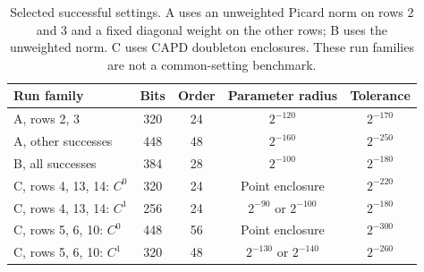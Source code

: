 \begin{table}[htbp]
\centering\small
\begin{tabular}{@{}lcccc@{}}
\toprule
Run family & Bits & Order & Parameter radius & Tolerance\\
\midrule
A, rows 2, 3 & 320 & 24 & $2^{-120}$ & $2^{-170}$\\
A, other successes & 448 & 48 & $2^{-160}$ & $2^{-250}$\\
B, all successes & 384 & 28 & $2^{-100}$ & $2^{-180}$\\
C, rows 4, 13, 14: $C^0$ & 320 & 24 & Point enclosure & $2^{-220}$\\
C, rows 4, 13, 14: $C^1$ & 256 & 24 & $2^{-90}$ or $2^{-100}$ & $2^{-180}$\\
C, rows 5, 6, 10: $C^0$ & 448 & 56 & Point enclosure & $2^{-300}$\\
C, rows 5, 6, 10: $C^1$ & 320 & 48 & $2^{-130}$ or $2^{-140}$ & $2^{-260}$\\
\bottomrule
\end{tabular}
\caption{Selected successful settings. A uses an unweighted Picard
norm on rows 2 and 3 and a fixed diagonal weight on the other rows;
B uses the unweighted norm. C uses CAPD doubleton enclosures. These
run families are not a common-setting benchmark.}
\label{tab:settings}
\end{table}

